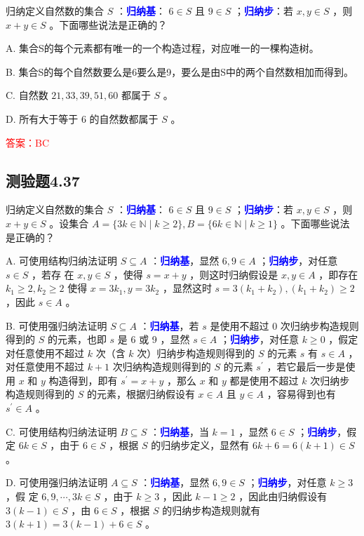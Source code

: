 \documentclass[UTF8, heading=true]{ctexart}
\begin{document}
归纳定义自然数的集合 $S$ ：\textcolor{blue}{\textbf{归纳基}}： $6 \in S$ 且 $9 \in S$ ；\textcolor{blue}{\textbf{归纳步}}：若 $x, y \in S$ ，则 $x+y \in S$ 。下面哪些说法是正确的？

A. 集合S的每个元素都有唯一的一个构造过程，对应唯一的一棵构造树。

B. 集合S的每个自然数要么是6要么是9，要么是由S中的两个自然数相加而得到。

C. 自然数 $21,33,39,51,60$ 都属于 $S$ 。

D. 所有大于等于 6 的自然数都属于 $S$ 。

\textcolor{red}{答案：BC}


\subsection{测验题4.37}

归纳定义自然数的集合 $S$ ：\textcolor{blue}{\textbf{归纳基}}： $6 \in S$ 且 $9 \in S$ ；\textcolor{blue}{\textbf{归纳步}}：若 $x, y \in S$ ，则 $x+y \in S$ 。设集合 $A=\{3 k \in \mathbb{N} \mid k \geq 2\}, B=\{6 k \in \mathbb{N} \mid k \geq 1\}$ 。下面哪些说法是正确的？

A. 可使用结构归纳法证明 $S \subseteq A$ ：\textcolor{blue}{\textbf{归纳基}}，显然 $6,9 \in A$ ；\textcolor{blue}{\textbf{归纳步}}，对任意 $s \in S$ ，若存
在 $x, y \in S$ ，使得 $s=x+y$ ，则这时归纳假设是 $x, y \in A$ ，即存在 $k_1 \geq 2, k_2 \geq 2$ 使得 $x=3 k_1, y=3 k_2$ ，显然这时 $s=3\left(k_1+k_2\right),\left(k_1+k_2\right) \geq 2$ ，因此 $s \in A$ 。

B. 可使用强归纳法证明 $S \subseteq A$ ：\textcolor{blue}{\textbf{归纳基}}，若 $s$ 是使用不超过 0 次归纳步构造规则得到的 $S$ 的元素，也即 $s$ 是 6 或 9 ，显然 $s \in A$ ；\textcolor{blue}{\textbf{归纳步}}，对任意 $k \geq 0$ ，假定对任意使用不超过 $k$ 次（含 $k$ 次）归纳步构造规则得到的 $S$ 的元素 $s$ 有 $s \in A$ ，对任意使用不超过 $k+1$ 次归纳构造规则得到的 $S$ 的元素 $s^{\prime}$ ，若它最后一步是使用 $x$ 和 $y$ 构造得到，即有 $s^{\prime}=x+y$ ，那么 $x$ 和 $y$ 都是使用不超过 $k$ 次归纳步构造规则得到的 $S$ 的元素，根据归纳假设有 $x \in A$ 且 $y \in A$ ，容易得到也有 $s^{\prime} \in A$ 。

C. 可使用结构归纳法证明 $B \subseteq S$ ：\textcolor{blue}{\textbf{归纳基}}，当 $k=1$ ，显然 $6 \in S$ ；\textcolor{blue}{\textbf{归纳步}}，假定 $6 k \in S$ ，由于 $6 \in S$ ，根据 $S$ 的归纳步定义，显然有 $6 k+6=6(k+1) \in S$ 。

D. 可使用强归纳法证明 $A \subseteq S$ ：\textcolor{blue}{\textbf{归纳基}}，显然 $6,9 \in S$ ；\textcolor{blue}{\textbf{归纳步}}，对任意 $k \geq 3$ ，假
定 $6,9, \cdots, 3 k \in S$ ，由于 $k \geq 3$ ，因此 $k-1 \geq 2$ ，因此由归纳假设有 $3(k-1) \in S$ ，由 $6 \in S$ ，根据 $S$ 的归纳步构造规则就有 $3(k+1)=3(k-1)+6 \in S$ 。
\end{document}
